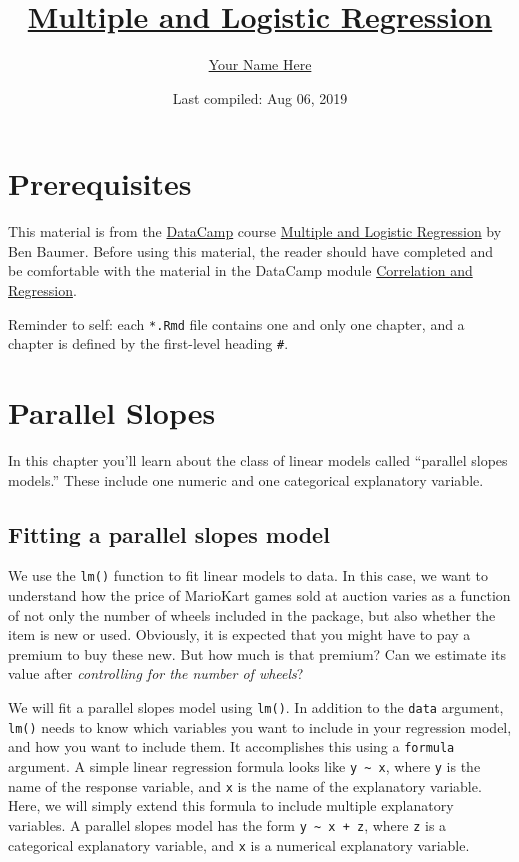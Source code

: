 \documentclass[]{book}
\title{\href{https://www.datacamp.com/courses/multiple-and-logistic-regression}{Multiple
and Logistic Regression}}
\author{\href{https://your_username.github.io/}{Your Name Here}}
\date{Last compiled: Aug 06, 2019}
\begin{document}
\maketitle

{
\setcounter{tocdepth}{1}
\tableofcontents
}
\chapter{Prerequisites}\label{prerequisites}

This material is from the \href{https://www.datacamp.com}{DataCamp}
course
\href{https://www.datacamp.com/courses/multiple-and-logistic-regression}{Multiple
and Logistic Regression} by Ben Baumer. Before using this material, the
reader should have completed and be comfortable with the material in the
DataCamp module
\href{https://www.datacamp.com/courses/correlation-and-regression}{Correlation
and Regression}.

Reminder to self: each \texttt{*.Rmd} file contains one and only one
chapter, and a chapter is defined by the first-level heading
\texttt{\#}.

\chapter{Parallel Slopes}\label{parallel-slopes}

In this chapter you'll learn about the class of linear models called
``parallel slopes models.'' These include one numeric and one
categorical explanatory variable.

\section{Fitting a parallel slopes
model}\label{fitting-a-parallel-slopes-model}

We use the \texttt{lm()} function to fit linear models to data. In this
case, we want to understand how the price of MarioKart games sold at
auction varies as a function of not only the number of wheels included
in the package, but also whether the item is new or used. Obviously, it
is expected that you might have to pay a premium to buy these new. But
how much is that premium? Can we estimate its value after
\emph{controlling for the number of wheels}?

We will fit a parallel slopes model using \texttt{lm()}. In addition to
the \texttt{data} argument, \texttt{lm()} needs to know which variables
you want to include in your regression model, and how you want to
include them. It accomplishes this using a \texttt{formula} argument. A
simple linear regression formula looks like
\texttt{y\ \textasciitilde{}\ x}, where \texttt{y} is the name of the
response variable, and \texttt{x} is the name of the explanatory
variable. Here, we will simply extend this formula to include multiple
explanatory variables. A parallel slopes model has the form
\texttt{y\ \textasciitilde{}\ x\ +\ z}, where \texttt{z} is a
categorical explanatory variable, and \texttt{x} is a numerical
explanatory variable.
\end{document}

